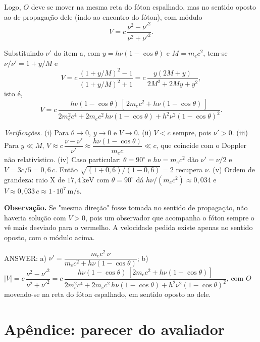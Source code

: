 \documentclass{article}%
\begin{document}
Logo, $O$ deve se mover na mesma reta do fóton espalhado, mas no sentido oposto ao de propagação dele (indo ao encontro do fóton), com módulo
\[ V=c\,\frac{\nu^2-\nu'^2}{\nu^2+\nu'^2}. \]

Substituindo $\nu'$ do item a, com $y=h\nu(1-\cos\theta)$ e $M=m_ec^2$, tem-se $\nu/\nu'=1+y/M$ e
\[ V=c\,\frac{(1+y/M)^2-1}{(1+y/M)^2+1}=c\,\frac{y(2M+y)}{2M^2+2My+y^2}, \]
isto é,
\[ V=c\,\frac{h\nu(1-\cos\theta)\,[\,2m_ec^2+h\nu(1-\cos\theta)\,]}{2m_e^2c^4+2m_ec^2\,h\nu(1-\cos\theta)+h^2\nu^2(1-\cos\theta)^2}. \]

\textit{Verificações.} (i) Para $\theta\to 0$, $y\to 0$ e $V\to 0$. (ii) $V<c$ sempre, pois $\nu'>0$. (iii) Para $y\ll M$, $V\approx c\,\dfrac{\nu-\nu'}{\nu'}\approx \dfrac{h\nu(1-\cos\theta)}{m_ec}\ll c$, que coincide com o Doppler não relativístico. (iv) Caso particular: $\theta=90^\circ$ e $h\nu=m_ec^2$ dão $\nu'=\nu/2$ e $V=3c/5=0,6\,c$. Então $\sqrt{(1+0,6)/(1-0,6)}=2$ recupera $\nu$. (v) Ordem de grandeza: raio X de $17,4\,\mathrm{keV}$ com $\theta=90^\circ$ dá $h\nu/(m_ec^2)\approx 0,034$ e $V\approx 0,033\,c\approx 1\cdot 10^{7}\,\mathrm{m/s}$.

\textbf{Observação.} Se "mesma direção" fosse tomada no sentido de propagação, não haveria solução com $V>0$, pois um observador que acompanha o fóton sempre o vê mais desviado para o vermelho. A velocidade pedida existe apenas no sentido oposto, com o módulo acima.

ANSWER: a) $\nu'=\dfrac{m_ec^2\,\nu}{m_ec^2+h\nu(1-\cos\theta)}$; b) $|V|=c\,\dfrac{\nu^2-\nu'^2}{\nu^2+\nu'^2}=c\,\dfrac{h\nu(1-\cos\theta)\,[2m_ec^2+h\nu(1-\cos\theta)]}{2m_e^2c^4+2m_ec^2\,h\nu(1-\cos\theta)+h^2\nu^2(1-\cos\theta)^2}$, com $O$ movendo-se na reta do fóton espalhado, em sentido oposto ao dele.%
\newpage%
\section*{Apêndice: parecer do avaliador}%
\end{document}
